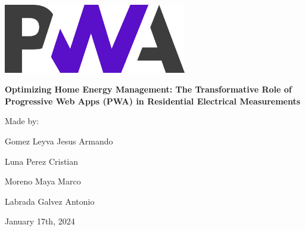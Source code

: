 \documentclass{article}
\begin{document}
\begin{titlepage}
    \centering
    \includegraphics[width=0.6\textwidth]{images/logo.png}
    
    \vspace{2cm}

    {\fontsize{24pt}{28.8pt}\selectfont {}\selectfont \textbf{Optimizing Home Energy Management: The Transformative Role of Progressive Web Apps (PWA) in Residential Electrical Measurements}}
    \vspace{1cm}
    
    {\Large Made by:}

    \vspace{1cm}

    {\fontsize{10pt}{28.8pt}\selectfont Gomez Leyva Jesus Armando}

    \vspace{0.5cm}
    {\fontsize{10pt}{28.8pt}\selectfont Luna Perez Cristian}

    \vspace{0.5cm}
    {\fontsize{10pt}{28.8pt}\selectfont Moreno Maya Marco}

    \vspace{0.5cm}
    {\fontsize{10pt}{28.8pt}\selectfont Labrada Galvez Antonio}
    
    \vspace{2cm}
    
    {\large January 17th, 2024}
    
\end{titlepage}
\end{document}
